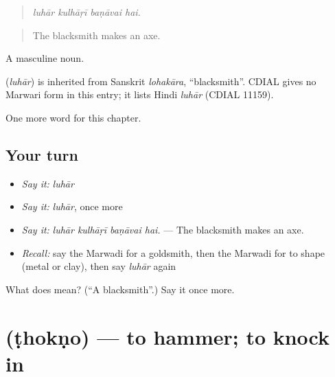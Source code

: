 \begin{quote}
   
\end{quote}

\begin{quote}
\emph{luhār kulhāṛī baṇāvai hai.}
\end{quote}

\begin{quote}
The blacksmith makes an axe.
\end{quote}

A masculine noun.

\begin{cousinweb}
\textbf{} (\emph{luhār}) is inherited from Sanskrit \emph{lohakāra}, \textquotedblleft{}blacksmith\textquotedblright{}. CDIAL gives no Marwari form in this entry; it lists Hindi \emph{luhār} (CDIAL 11159).
\end{cousinweb}

\begin{grammarlens}[title={What you've built}]
One more word for this chapter.
\end{grammarlens}

\subsection*{Your turn}
\begin{itemize}
\raggedright
  \item \emph{Say it:} \emph{luhār}
  \item \emph{Say it:} \emph{luhār}, once more
  \item \emph{Say it:} \emph{luhār kulhāṛī baṇāvai hai.} — The blacksmith makes an axe.
  \item \emph{Recall:} say the Marwadi for a goldsmith, then the Marwadi for to shape (metal or clay), then say \emph{luhār} again
\end{itemize}

\begin{tcolorbox}[breakable,colback=teal!4,colframe=teal!35!black,title={Before you move on}]
What does  mean? (\textquotedblleft{}A blacksmith\textquotedblright{}.) Say it once more.
\end{tcolorbox}
\section[\texorpdfstring{\mw{ठोकणो} (ṭhokṇo)}{ठोकणो (ṭhokṇo)}]{ (ṭhokṇo) — to hammer; to knock in}

